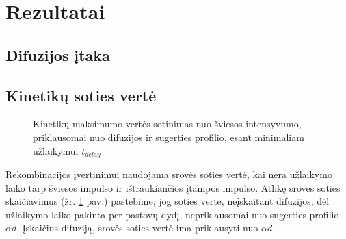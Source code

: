 \section{Rezultatai}

\subsection{Difuzijos įtaka}


\subsection{Kinetikų soties vertė}
\label{page:saturation}
\begin{figure}[h]
  \centering
  \caption{Kinetikų maksimumo vertės sotinimas nuo šviesos intensyvumo, priklausomai nuo difuzijos ir sugerties profilio, esant minimaliam užlaikymui $t_{delay}$}
  \label{fig:saturation}
\end{figure}

Rekombinacijos įvertinimui naudojama srovės soties vertė, kai nėra užlaikymo laiko tarp šviesos impulso ir ištraukiančios įtampos impulso. Atlikę srovės soties skaičiavimus (žr. \ref{fig:saturation} pav.) pastebime, jog soties vertė, neįskaitant difuzijos, dėl užlaikymo laiko pakinta per pastovų dydį, nepriklausomai nuo sugerties profilio $\alpha d$. Įskaičius difuziją, srovės soties vertė ima priklausyti nuo $\alpha d$.


